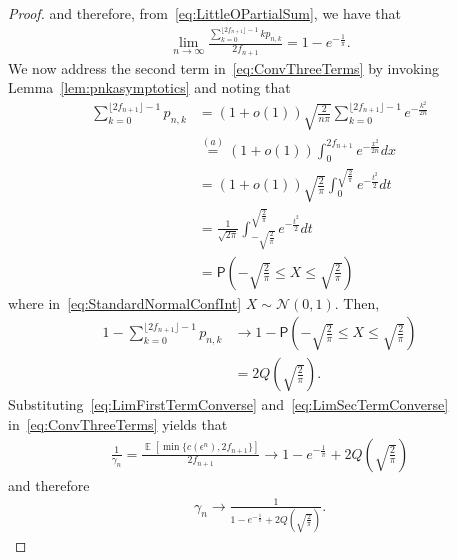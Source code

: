 \documentclass[twoside]{article}
\newcommand{\Prob}{\mathsf{P}}
\newcommand{\g}{\gamma}
\newcommand{\e}{\epsilon}
\DeclareMathOperator\E{\mathbb{E}}
\begin{document}
\begin{proof}
    and therefore, from~\eqref{eq:LittleOPartialSum}, we have that 
    \begin{align}\label{eq:LimFirstTermConverse}
        \lim_{n \to \infty}  \frac{\sum_{k=0}^{\lfloor 2f_{n+1} \rfloor-1} k p_{n,k}}{2f_{n+1}}  = 1-e^{-\frac{1}{\pi}}.
    \end{align}
    We now address the second term in~\eqref{eq:ConvThreeTerms} by invoking Lemma~\ref{lem:pnkasymptotics} and noting that 
    \begin{align}
       \sum_{k=0}^{\lfloor 2f_{n+1} \rfloor-1} p_{n,k} &= (1+o(1)) \sqrt{\frac{2}{n \pi}}\sum_{k=0}^{\lfloor 2f_{n+1} \rfloor-1} e^{-\frac{k^2}{2n}} \nonumber\\
       &\stackrel{(a)}{=} (1+o(1)) \int_{0}^{2f_{n+1}} e^{-\frac{x^2}{2n}} dx \nonumber\\
       &= (1+o(1)) \sqrt{\frac{2}{\pi}} \int_{0}^{\sqrt{\frac{2}{\pi}}} e^{-\frac{t^2}{2}} dt \nonumber\\
       &= \frac{1}{\sqrt{2\pi}} \int_{-\sqrt{\frac{2}{\pi}}}^{\sqrt{\frac{2}{\pi}}} e^{-\frac{t^2}{2}} dt \nonumber \\
        &= \Prob\left(-\sqrt{\frac{2}{\pi}} \le X \le \sqrt{\frac{2}{\pi}}\right) \label{eq:StandardNormalConfInt}
    \end{align}
    where in~\eqref{eq:StandardNormalConfInt} $X \sim \mathcal{N}(0,1)$. Then, 
    \begin{align}
        1- \sum_{k=0}^{\lfloor 2f_{n+1} \rfloor-1} p_{n,k}  &\to 1-\Prob\left(-\sqrt{\frac{2}{\pi}} \le X \le \sqrt{\frac{2}{\pi}}\right) \nonumber\\
        &= 2Q\left(\sqrt{\frac{2}{\pi}}\right) \label{eq:LimSecTermConverse}. 
    \end{align}
    Substituting~\eqref{eq:LimFirstTermConverse} and~\eqref{eq:LimSecTermConverse} in~\eqref{eq:ConvThreeTerms} yields that 
    \begin{align}
     \frac{1}{\g_n} = \frac{\E[\min\{c(\e^n), 2f_{n+1}\}]}{2f_{n+1}} \to 1-e^{-\frac{1}{\pi}} + 2Q\left(\sqrt{\frac{2}{\pi}}\right)
    \end{align}
    and therefore 
    \begin{align}\label{eq:finalGammaLimit}
        \g_n \to \frac{1}{1-e^{-\frac{1}{\pi}} + 2Q\left(\sqrt{\frac{2}{\pi}}\right)}. 
    \end{align}
\end{proof}
\end{document}
